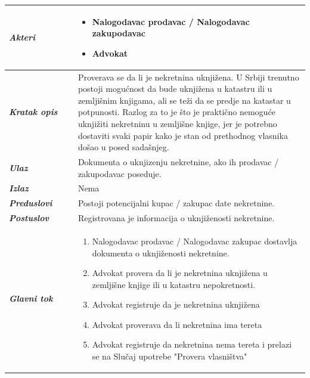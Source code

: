 \documentclass[20pt]{article}
\begin{document}
\begin{center}
\begin{longtable}{p{0.23\linewidth} p{0.77\linewidth}}
 \hline
 {\it \bfseries Akteri} & \begin{itemize}
    \item Nalogodavac prodavac / Nalogodavac zakupodavac
    \item Advokat
\end{itemize}\\
\hline

 {\it \bfseries Kratak opis} & Proverava se da li je nekretnina uknji\v zena. U Srbiji trenutno postoji mogu\' cnost da bude uknji\v zena u katastru ili u zemlji\v snim knjigama, ali se te\v zi da se predje na katastar u potpunosti. Razlog za to je \v sto je prakti\v cno nemogu\' ce uknji\v ziti nekretninu u zemlji\v sne knjige, jer je potrebno dostaviti svaki papir kako je stan od prethodnog vlasnika do\v sao u posed sada\v snjeg.\\ 
 \hline
 
 {\it \bfseries Ulaz} & Dokumenta o uknjizenju nekretnine, ako ih prodavac / zakupodavac poseduje.\\ 
 \hline
 
 {\it \bfseries Izlaz} & Nema\\
 \hline
 
 {\it \bfseries Preduslovi} & Postoji potencijalni kupac / zakupac date nekretnine.\\
 \hline

 {\it \bfseries Postuslov} & Registrovana je informacija o uknji\v zenosti nekretnine.\\
 \hline

     {\it \bfseries Glavni tok} &  
     \begin{enumerate}
        \item Nalogodavac prodavac / Nalogodavac zakupac dostavlja dokumenta o uknji\v zenosti nekretnine.
        \item Advokat provera da li je nekretnina uknji\v zena u zemlji\v sne knjige ili u katastru nepokretnosti.
        \item Advokat registruje da je nekretnina uknji\v zena 
        \item Advokat proverava da li nekretnina ima tereta 
        \item Advokat registruje da nekretnina nema tereta i prelazi se na Slu\v{c}aj upotrebe "Provera vlasni\v stva"
    \end{enumerate}\\
 \hline

\end{longtable}
\end{center}
\end{document}
